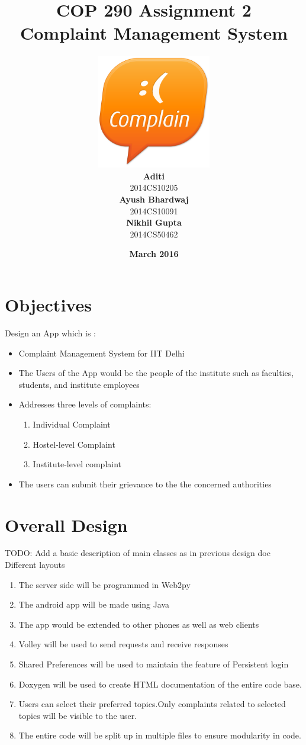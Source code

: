 \documentclass{article}
\title{\vspace*{\fill} \textbf{COP 290 Assignment 2}
	  \\ {\Large \textbf{Complaint Management System}}
}
\author{
	\vspace{5mm} \includegraphics[width=5cm]{logo.png} \\
	 \textbf{Aditi}\\
	2014CS10205 \vspace{2mm} \\
	\textbf{Ayush Bhardwaj}\\ 
	2014CS10091 \vspace{2mm} \\
	\textbf{Nikhil Gupta}\\ 
	2014CS50462 \vspace{2mm}
}
\date{\vspace{3mm} \textbf{March 2016} \vspace*{\fill}}
\begin{document}
	\maketitle

	\newpage

	\tableofcontents

	\newpage

	\section{Objectives}
		Design an App which is :
		\begin{itemize} 
			\item Complaint Management System for IIT Delhi
			\item The Users of the App would be the people of the institute such as faculties, students, and institute employees
			\item Addresses three levels of complaints: 
				\begin{enumerate}
					\item Individual Complaint 
					\item Hostel-level Complaint
					\item Institute-level complaint
				\end{enumerate}
			\item The users can submit their grievance to the the concerned authorities
		\end{itemize}
	\section{Overall Design}
		TODO:  Add a basic description of main classes as in previous design doc 
		Different layouts
		\begin{enumerate}
			\item The server side will be programmed in Web2py ~\cite{Web2py_Basics}
			\item The android app will be made using Java
			\item The app would be extended to other phones as well as web clients
			\item Volley will be used to send requests and receive responses
			\item Shared Preferences will be used to maintain the feature of Persistent login 
			\item Doxygen will be used to create HTML documentation of the entire code base.
			\item Users can select their preferred topics.Only complaints related to selected topics will be visible to the user.
			\item The entire code will be split up in multiple files to ensure modularity in code. 
		\end{enumerate}
\end{document}
